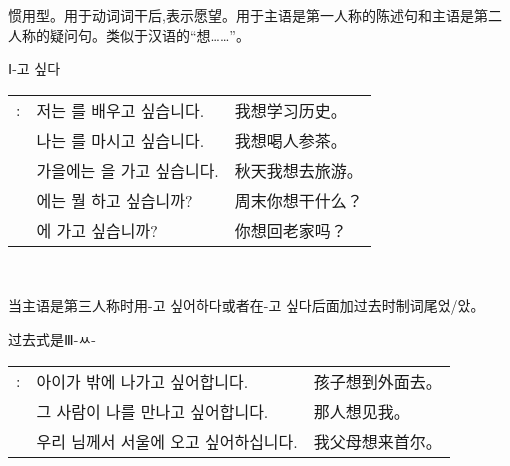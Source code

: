 \begin{grammar}
\begin{grammarsect}[\kr -고 싶다]
\begin{itemize}
            \item 惯用型。用于动词词干后,表示愿望。用于主语是第一人称的陈述句和主语是第二人称的疑问句。类似于汉语的“想……”。
            {\color{gray} \item Ⅰ{\kr -고 싶다} }
        \end{itemize}
        \begin{tabular}{lll}
            \kr \ruby{例}{예}: &\kr 저는 \ruby{歷史}{역사}를 배우고 싶습니다.&我想学习历史。\\
            &\kr 나는 \ruby{人蔘茶}{인삼차}를 마시고 싶습니다.&我想喝人参茶。\\
            &\kr 가을에는 \ruby{旅行}{여행}을 가고 싶습니다.&秋天我想去旅游。\\
            &\kr \ruby{週末}{주말}에는 뭘 하고 싶습니까?&周末你想干什么？\\
            &\kr \ruby{故鄉}{고향}에 가고 싶습니까?&你想回老家吗？
        \end{tabular}\\
        \begin{itemize}
            \item 当主语是第三人称时用{\kr -고 싶어하다}或者在{\kr -고 싶다}后面加过去时制词尾{\kr 었/았}。
            {\color{gray} \item 过去式是Ⅲ-ㅆ-} 
        \end{itemize}
        \begin{tabular}{lll}
            \kr \ruby{例}{예}: &\kr 아이가 밖에 나가고 싶어합니다. &孩子想到外面去。\\
            &\kr 그 사람이 나를 만나고 싶어합니다. &那人想见我。\\
            &\kr 우리 \ruby{父母}{부모}님께서 서울에 오고 싶어하십니다.&我父母想来首尔。
        \end{tabular}\\
    \end{grammarsect}
\end{grammar}
